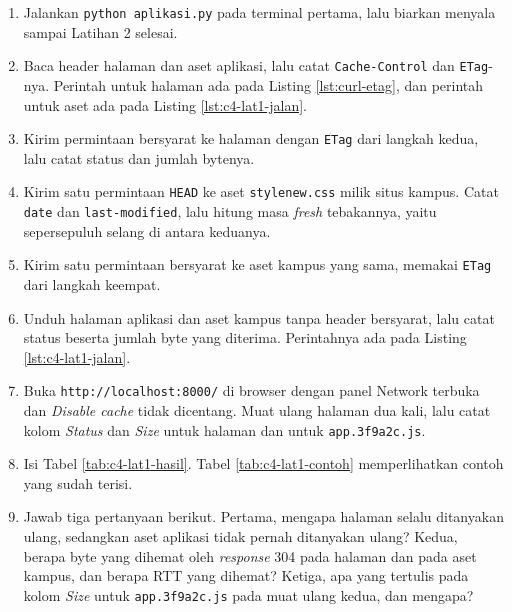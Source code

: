 \begin{enumerate}
  \item Jalankan \texttt{python aplikasi.py} pada terminal pertama, lalu
        biarkan menyala sampai Latihan 2 selesai.
  \item Baca header halaman dan aset aplikasi, lalu catat
        \texttt{Cache-Control} dan \texttt{ETag}-nya. Perintah untuk halaman
        ada pada Listing \ref{lst:curl-etag}, dan perintah untuk aset ada pada
        Listing \ref{lst:c4-lat1-jalan}.
  \item Kirim permintaan bersyarat ke halaman dengan \texttt{ETag} dari langkah
        kedua, lalu catat status dan jumlah bytenya.
  \item Kirim satu permintaan \texttt{HEAD} ke aset \texttt{stylenew.css}
        milik situs kampus. Catat \texttt{date} dan \texttt{last-modified},
        lalu hitung masa \textit{fresh} tebakannya, yaitu sepersepuluh selang di antara
        keduanya.
  \item Kirim satu permintaan bersyarat ke aset kampus yang sama, memakai
        \texttt{ETag} dari langkah keempat.
  \item Unduh halaman aplikasi dan aset kampus tanpa header bersyarat, lalu
        catat status beserta jumlah byte yang diterima. Perintahnya ada pada
        Listing \ref{lst:c4-lat1-jalan}.
  \item Buka \texttt{http://localhost:8000/} di browser dengan panel Network
        terbuka dan \emph{Disable cache} tidak dicentang. Muat ulang halaman
        dua kali, lalu catat kolom \emph{Status} dan \emph{Size} untuk halaman
        dan untuk \texttt{app.3f9a2c.js}.
  \item Isi Tabel \ref{tab:c4-lat1-hasil}. Tabel \ref{tab:c4-lat1-contoh}
        memperlihatkan contoh yang sudah terisi.
  \item Jawab tiga pertanyaan berikut. Pertama, mengapa halaman selalu
        ditanyakan ulang, sedangkan aset aplikasi tidak pernah ditanyakan
        ulang? Kedua, berapa byte yang dihemat oleh \textit{response} 304 pada halaman
        dan pada aset kampus, dan berapa RTT yang dihemat? Ketiga, apa yang
        tertulis pada kolom \emph{Size} untuk \texttt{app.3f9a2c.js} pada muat
        ulang kedua, dan mengapa?
\end{enumerate}


